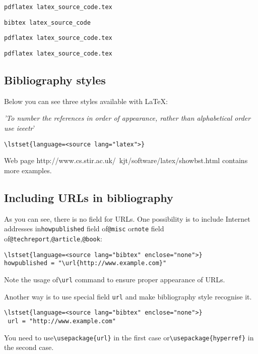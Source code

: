 \verb|pdflatex latex_source_code.tex|

\verb|bibtex latex_source_code|

\verb|pdflatex latex_source_code.tex|

\verb|pdflatex latex_source_code.tex|

\subsection{Bibliography styles}
Below you can see three styles available with LaTeX: %

\textit{'To number the references in order of appearance, rather than alphabetical order use ieeetr}'

\begin{lstlisting}
\lstset{language=<source lang="latex">}

\end{lstlisting}

Web page http://www.cs.stir.ac.uk/~kjt/software/latex/showbst.html contains more examples.

\subsection{Including URLs in bibliography}
As you can see, there is no field for URLs. One possibility is to include
Internet addresses in\verb|howpublished| field of\verb|@misc| or\verb|note|
field of\verb|@techreport|,\verb|@article|,\verb|@book|:
\begin{lstlisting}
\lstset{language=<source lang="bibtex" enclose="none">}
howpublished = "\url{http://www.example.com}"
\end{lstlisting}
Note the usage of\verb|\url| command to ensure proper appearance of URLs.

Another way is to use special field \verb|url| and make bibliography style recognise it.

\begin{lstlisting}
\lstset{language=<source lang="bibtex" enclose="none">}
 url = "http://www.example.com"
\end{lstlisting}
You need to use\verb|\usepackage{url}| in the first case or\verb|\usepackage{hyperref}| in the second case.

